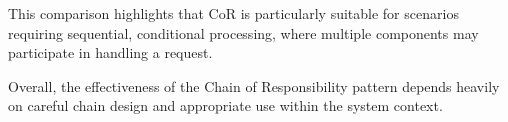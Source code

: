 This comparison highlights that CoR is particularly suitable for scenarios requiring sequential, conditional processing, where multiple components may participate in handling a request.

Overall, the effectiveness of the Chain of Responsibility pattern depends heavily on careful chain design and appropriate use within the system context.